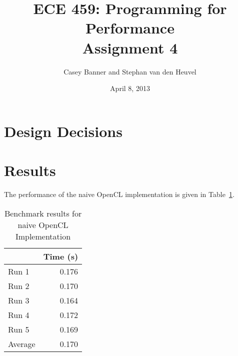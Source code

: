 \documentclass[12pt]{article}
\title{ECE 459: Programming for Performance\\Assignment 4}
\author{Casey Banner and Stephan van den Heuvel}
\date{April 8, 2013}
\begin{document}
\maketitle

\section{Design Decisions}

\section{Results}

The performance of the naive OpenCL implementation is given in Table~\ref{tbl-naive-bench}.

\begin{table}[H]
  \centering
  \begin{tabular}{lr}
    & {\bf Time (s)} \\
    \hline
    Run 1 & 0.176 \\
    Run 2 & 0.170 \\
    Run 3 & 0.164 \\
    Run 4 & 0.172 \\
    Run 5 & 0.169 \\
    \hline
    Average & 0.170 \\
  \end{tabular}
  \caption{Benchmark results for naive OpenCL Implementation}
  \label{tbl-naive-bench}
\end{table}



\end{document}
